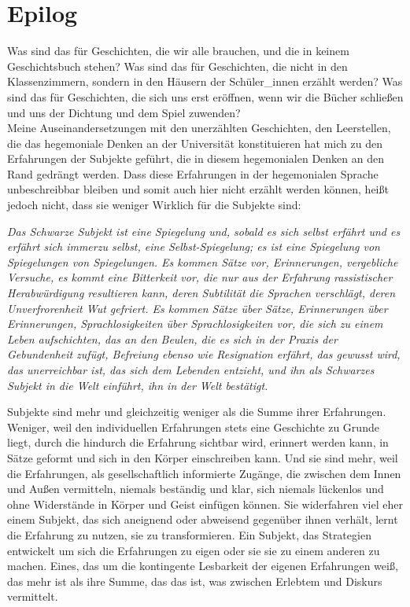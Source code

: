 \section{Epilog}
Was sind das für Geschichten, die wir alle brauchen, und die in
keinem Geschichtsbuch stehen? Was sind das für Geschichten, die nicht in den
Klassenzimmern, sondern in den Häusern der Schüler\_innen erzählt werden? Was
sind das für Geschichten, die sich uns erst eröffnen, wenn wir die Bücher
schließen und uns der Dichtung und dem Spiel zuwenden?\\

\noindent Meine Auseinandersetzungen mit den unerzählten Geschichten, den Leerstellen, die
das hegemoniale Denken an der Universität konstituieren hat mich zu den
Erfahrungen der Subjekte geführt, die in diesem hegemonialen Denken an den Rand
gedrängt werden. Dass diese Erfahrungen in der hegemonialen Sprache
unbeschreibbar bleiben und somit auch hier nicht erzählt werden  können, heißt jedoch nicht, dass sie weniger Wirklich für die Subjekte sind:
\begin{myenv}
\textit{Das Schwarze Subjekt ist eine Spiegelung und, sobald es sich selbst erfährt und
es erfährt sich immerzu selbst, eine Selbst-Spiegelung; es ist eine Spiegelung
von Spiegelungen von Spiegelungen. Es kommen Sätze vor, Erinnerungen,
vergebliche Versuche, es kommt eine Bitterkeit vor, die nur aus der Erfahrung
rassistischer Herabwürdigung resultieren kann, deren Subtilität die Sprachen
verschlägt, deren Unverfrorenheit Wut gefriert. Es kommen Sätze über Sätze,
Erinnerungen über Erinnerungen, Sprachlosigkeiten über Sprachlosigkeiten vor,
die sich zu einem Leben aufschichten, das an den Beulen, die es sich in der
Praxis der Gebundenheit zufügt, Befreiung ebenso wie Resignation erfährt, das
gewusst wird, das unerreichbar ist, das sich dem Lebenden entzieht, und ihn als
Schwarzes Subjekt in die Welt einführt, ihn in der Welt bestätigt.\footnotemark
{}}
\end{myenv}
Subjekte sind mehr und gleichzeitig weniger als die Summe ihrer Erfahrungen.\\
Weniger, weil den individuellen Erfahrungen stets eine Geschichte zu Grunde
liegt, durch die hindurch die Erfahrung sichtbar wird, erinnert werden kann, in
Sätze geformt und sich in den Körper einschreiben kann. Und sie sind mehr, weil
die Erfahrungen, als gesellschaftlich informierte Zugänge, die zwischen dem
Innen und Außen vermitteln, niemals beständig und klar, sich niemals lückenlos
und ohne Widerstände in Körper und Geist einfügen können. Sie widerfahren viel
eher einem Subjekt, das sich aneignend oder abweisend gegenüber ihnen verhält,
lernt die Erfahrung zu nutzen, sie zu transformieren. Ein Subjekt, das
Strategien entwickelt um sich die Erfahrungen zu eigen oder sie sie zu einem
anderen zu machen. Eines, das um die kontingente Lesbarkeit der eigenen
Erfahrungen weiß, das mehr ist als ihre Summe, das das ist, was zwischen Erlebtem
und Diskurs vermittelt.\\

